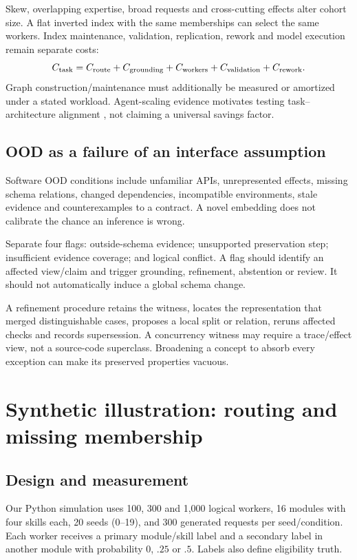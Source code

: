 \documentclass[11pt]{article}
\begin{document}
Skew, overlapping expertise, broad requests and cross-cutting effects alter cohort size. A flat inverted index with the same memberships can select the same workers. Index maintenance, validation, replication, rework and model execution remain separate costs:
\begin{equation}
C_{\rm task}=C_{\rm route}+C_{\rm grounding}+C_{\rm workers}+C_{\rm validation}+C_{\rm rework}.
\end{equation}
Graph construction/maintenance must additionally be measured or amortized under a stated workload. Agent-scaling evidence motivates testing task--architecture alignment \citep{scaling2025}, not claiming a universal savings factor.

\subsection{OOD as a failure of an interface assumption}
Software OOD conditions include unfamiliar APIs, unrepresented effects, missing schema relations, changed dependencies, incompatible environments, stale evidence and counterexamples to a contract. A novel embedding does not calibrate the chance an inference is wrong.

Separate four flags: outside-schema evidence; unsupported preservation step; insufficient evidence coverage; and logical conflict. A flag should identify an affected view/claim and trigger grounding, refinement, abstention or review. It should not automatically induce a global schema change.

A refinement procedure retains the witness, locates the representation that merged distinguishable cases, proposes a local split or relation, reruns affected checks and records supersession. A concurrency witness may require a trace/effect view, not a source-code superclass. Broadening a concept to absorb every exception can make its preserved properties vacuous.

\section{Synthetic illustration: routing and missing membership}
\subsection{Design and measurement}
Our Python simulation uses 100, 300 and 1,000 logical workers, 16 modules with four skills each, 20 seeds (0--19), and 300 generated requests per seed/condition. Each worker receives a primary module/skill label and a secondary label in another module with probability $0$, $.25$ or $.5$. Labels also define eligibility truth.
\end{document}
